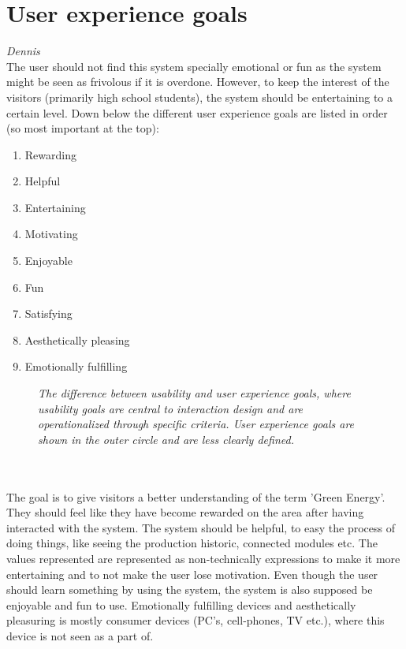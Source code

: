 \section{User experience goals}\textit{Dennis}\\
The user should not find this system specially emotional or fun as the system might be seen as frivolous if it is overdone. However, to keep the interest of the visitors (primarily high school students), the system should be entertaining to a certain level.  
Down below the different user experience goals are listed in order (so most important at the top):
\begin{enumerate}
	\item Rewarding
	\item Helpful
	\item Entertaining
	\item Motivating
	\item Enjoyable
	\item Fun
	\item Satisfying
	\item Aesthetically pleasing
	\item Emotionally fulfilling
\end{enumerate}


\begin{figure}
	\center
		\setlength\fboxsep{0pt}
		\setlength\fboxrule{0pt}
   	\caption{\textit{The difference between usability and user experience goals, where  usability goals are central to
  			interaction design and are operationalized through specific criteria. 
  			User experience goals are shown in the outer circle and are less clearly defined.}}
   	\label{fig:index_page_design}
\end{figure}
\textbf{ }\\ \\ 
The goal is to give visitors a better understanding of the term 'Green Energy'. They should feel like they have become rewarded on the area after having interacted with the system. The system should be helpful, to easy the process of doing things, like seeing the production historic, connected modules etc. The values represented are represented as non-technically expressions to make it more entertaining and to not make the user lose motivation. Even though the user should learn something by using the system, the system is also supposed be enjoyable and fun to use. Emotionally fulfilling devices and aesthetically pleasuring is mostly consumer devices (PC's, cell-phones, TV etc.), where this device is not seen as a part of.